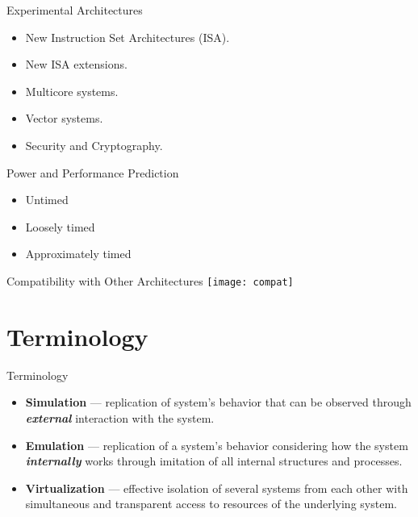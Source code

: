 \begin{frame}{Experimental Architectures}

\begin{itemize}
\item New Instruction Set Architectures (ISA).
\item New ISA extensions.
\item Multicore systems.
\item Vector systems.
\item Security and Cryptography.
\end{itemize}

\end{frame}

\begin{frame}{Power and Performance Prediction}

\begin{itemize}
\item Untimed
\item Loosely timed
\item Approximately timed
\end{itemize}

\end{frame}

\begin{frame}{Compatibility with Other Architectures}
\texttt{[image: compat]} %
\end{frame}

\section{Terminology}

\begin{frame}{Terminology}
\begin{itemize}
\item \textbf{Simulation} --- replication of system's behavior that can be
      observed through \textbf{\textit{external}} interaction with the system.
\item \textbf{Emulation} --- replication of a system's behavior considering how
      the system \textbf{\textit{internally}} works through imitation of all
      internal structures and processes.
\item \textbf{Virtualization} --- effective isolation of several systems from
      each other with simultaneous and transparent access to resources of the
      underlying system.
\end{itemize}

\end{frame}

